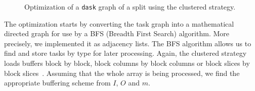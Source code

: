 \documentclass[conference]{IEEEtran}
\begin{document}
\begin{figure}
  \centering

  \qquad

  \caption{Optimization of a \texttt{dask} graph of a split using the clustered strategy.}
  \label{fig:bufferization}

\end{figure}

The optimization starts by converting the task graph into a mathematical
directed graph for use by a BFS (Breadth First Search) algorithm. More
precisely, we implemented it as adjacency lists. The BFS algorithm allows us to
find and store tasks by type for later processing.  Again, the clustered
strategy loads buffers block by block, block columns by block columns or block
slices by block slices~\cite{seqalgorithms}. Assuming that the whole array is
being processed, we find the appropriate buffering scheme from $I$, $O$ and $m$.
\end{document}

